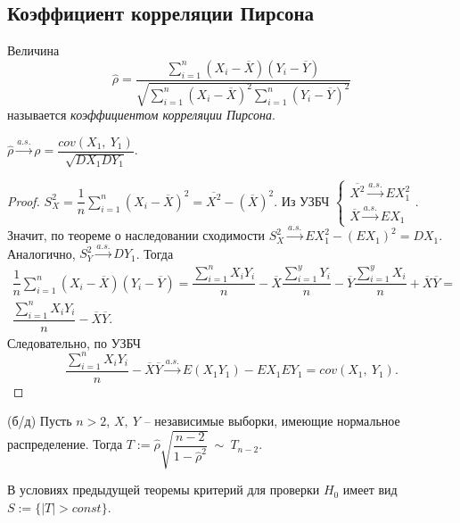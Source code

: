 \subsection{Коэффициент корреляции Пирсона}
\begin{definition}
    Величина
    \begin{equation*}
        \hat{\rho } =\dfrac{\sum _{i=1}^{n}( X_{i} -\overline{X})( Y_{i} -\overline{Y})}{\sqrt{\sum _{i=1}^{n}( X_{i} -\overline{X})^{2}\sum _{i=1}^{n}( Y_{i} -\overline{Y})^{2}}}
    \end{equation*}
    называется \textit{коэффициентом корреляции Пирсона}.
\end{definition}
\begin{proposition}
    $\displaystyle \hat{\rho }\xrightarrow{a.s.} \rho =\dfrac{cov( X_{1} ,\ Y_{1})}{\sqrt{DX_{1} DY_{1}}}$.
\end{proposition}
\begin{proof}
    $\displaystyle S_{X}^{2} =\dfrac{1}{n}\sum _{i=1}^{n}( X_{i} -\overline{X})^{2} =\overline{X^{2}} -(\overline{X})^{2}$. Из УЗБЧ $\displaystyle \begin{cases}
    \overline{X^{2}}\xrightarrow{a.s.} EX_{1}^{2}\\
    \overline{X}\xrightarrow{a.s.} EX_{1}
    \end{cases}$. Значит, по теореме о наследовании сходимости $\displaystyle S_{X}^{2}\xrightarrow{a.s.} EX_{1}^{2} -( EX_{1})^{2} =DX_{1}$. Аналогично, $\displaystyle S_{Y}^{2}\xrightarrow{a.s.} DY_{1}$. Тогда
    \begin{gather*}
        \dfrac{1}{n}\sum _{i=1}^{n}( X_{i} -\overline{X})( Y_{i} -\overline{Y}) =\dfrac{\sum _{i=1}^{n} X_{i} Y_{i}}{n} -\overline{X}\dfrac{\sum _{i=1}^{y} Y_{i}}{n} -\overline{Y}\dfrac{\sum _{i=1}^{y} X_{i}}{n} +\overline{X}\overline{Y} =\\
        \dfrac{\sum _{i=1}^{n} X_{i} Y_{i}}{n} -\overline{X}\overline{Y} .
    \end{gather*}
    Следовательно, по УЗБЧ
    \begin{equation*}
        \dfrac{\sum _{i=1}^{n} X_{i} Y_{i}}{n} -\overline{X}\overline{Y}\xrightarrow{a.s.} E( X_{1} Y_{1}) -EX_{1} EY_{1} =cov( X_{1} ,\ Y_{1}) .
    \end{equation*}
\end{proof}
\begin{theorem}
    (б/д) Пусть $\displaystyle n >2$, $\displaystyle X,\ Y$ -- независимые выборки, имеющие нормальное распределение. Тогда $\displaystyle T:=\hat{\rho }\sqrt{\dfrac{n-2}{1-\hat{\rho }^{2}}} \ \sim \ T_{n-2}$.
\end{theorem}
В условиях предыдущей теоремы критерий для проверки $\displaystyle H_{0}$ имеет вид $\displaystyle S:=\{| T|  >const\}$.
